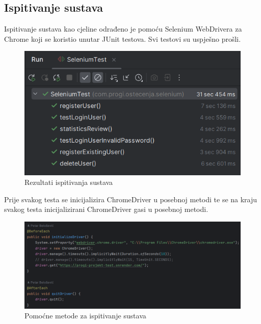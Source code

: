			
			\subsection{Ispitivanje sustava}
		 	
		 	Ispitivanje sustava kao cjeline odrađeno je pomoću Selenium WebDrivera za Chrome koji se koristio unutar JUnit testova. Svi testovi su uspješno prošli.
		 	
		 	\begin{figure}[H]
		 		\includegraphics[width=\textwidth]{slike/SeleniumTestoviRez.png} %
		 		\caption{Rezultati ispitivanja sustava}
		 		\label{fig:SeleniumTestovi} %
		 	\end{figure}
		 	
		 	Prije svakog testa se inicijalizira ChromeDriver u posebnoj metodi te se na kraju svakog testa inicijalizirani ChromeDriver gasi u posebnoj metodi.
		 	
		 	\begin{figure}[H]
		 		\includegraphics[width=\textwidth]{slike/SeleniumTestoviPomocneMetode.png} %
		 		\caption{Pomoćne metode za ispitivanje sustava}
		 		\label{fig:SeleniumTestoviPomocneMetode} %
		 	\end{figure}
		 	
